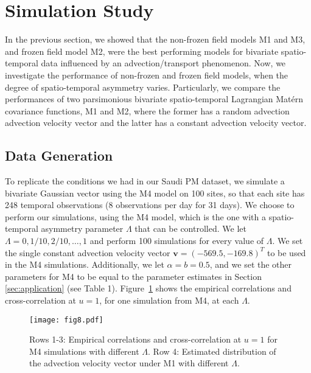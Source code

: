 \documentclass[12pt]{article}
\newcommand{\0}{\mathbf{0}}
\begin{document}
\section{Simulation Study}\label{sec:simulation}

In the previous section, we showed that the non-frozen field models M1 and M3, and frozen field model M2, were the best performing models for bivariate spatio-temporal data influenced by an advection/transport phenomenon. Now, we investigate the performance of non-frozen and frozen field models, when the degree of spatio-temporal asymmetry varies. Particularly, we compare the performances of two parsimonious bivariate spatio-temporal Lagrangian Mat\'{e}rn covariance functions, M1 and M2, where the former has a random advection advection velocity vector and the latter has a constant advection velocity vector.





 
\subsection{Data Generation}

To replicate the conditions we had in our Saudi PM dataset, we simulate a bivariate Gaussian vector using the M4 model on 100 sites, so that each site has 248 temporal observations (8 observations per day for 31 days). We choose to perform our simulations, using the M4 model, which is the one with a spatio-temporal asymmetry parameter $\Lambda$ that can be controlled. We let $\Lambda=0,1/10,2/10,\ldots,1$ and perform 100 simulations for every value of $\Lambda$. We set the single constant advection velocity vector $\mathbf{v}=(-569.5, -169.8)^T$ to be used in the M4 simulations. Additionally, we let $\alpha=b=0.5$, and we set the other parameters for M4 to be equal to the parameter estimates in Section \ref{sec:application}  (see Table 1). Figure~\ref{fig:m4data} shows the empirical correlations and cross-correlation at $u=1$, for one simulation from M4, at each $\Lambda$. 
\begin{figure}[t!]
 \centering
\texttt{[image: fig8.pdf]}
  \caption{\small Rows 1-3: Empirical correlations and cross-correlation at $u=1$ for M4 simulations with different $\Lambda$. Row 4: Estimated distribution of the advection velocity vector under M1 with different $\Lambda$.}
    \label{fig:m4data}
\end{figure}
\end{document}
